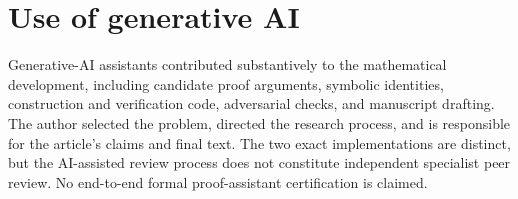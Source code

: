 \section*{Use of generative AI}

Generative-AI assistants contributed substantively to the mathematical
development, including candidate proof arguments, symbolic identities,
construction and verification code, adversarial checks, and manuscript
drafting. The author selected the problem, directed the research process,
and is responsible for the article's claims and final text. The two exact
implementations are distinct, but the AI-assisted review process does not
constitute independent specialist peer review. No end-to-end formal
proof-assistant certification is claimed.

